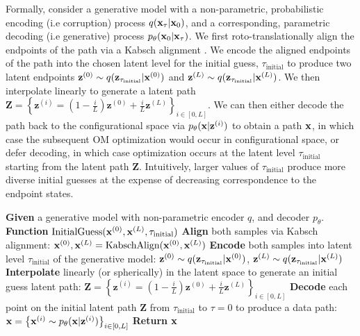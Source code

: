 Formally, consider a generative model with a non-parametric, probabilistic encoding (i.e corruption) process $q(\mathbf{x}_\tau | \mathbf{x}_0)$, and a corresponding, parametric decoding (i.e generative) process $p_\theta(\mathbf{x}_0 | \mathbf{x}_\tau)$. We first roto-translationally align the endpoints of the path via a Kabsch alignment \cite {kabsch1993automatic}. We encode the aligned endpoints of the path into the chosen latent level for the initial guess, $\tau_{\text{initial}}$ to produce two latent endpoints $\mathbf{z}^{(0)} \sim q(\mathbf{z}_{\tau_{\text{initial}}} | \mathbf{x}^{(0)})$ and $\mathbf{z}^{(L)} \sim q(\mathbf{z}_{\tau_{\text{initial}}} | \mathbf{x}^{(L)})$. We then interpolate linearly to generate a latent path $\mathbf{Z} = \left \{ \mathbf{z}^{(i)} = (1-\frac{i}{L})\mathbf{z}^{(0)} + \frac{i}{L}\mathbf{z}^{(L)} \right \}_{i \in \left[0, L \right]}$. We can then either decode the path back to the configurational space via $p_\theta(\mathbf{x} | \mathbf{z}^{(i)})$ to obtain a path $\mathbf{x}$, in which case the subsequent OM optimization would occur in configurational space, or defer decoding, in which case optimization occurs at the latent level $\tau_{\text{initial}}$ starting from the latent path $\mathbf{Z}$. Intuitively, larger values of $\tau_\text{initial}$ produce more diverse initial guesses at the expense of decreasing correspondence to the endpoint states.

\begin{algorithm}
\caption{Initial Guess Path Generation with a Generative Model}
\begin{algorithmic}[1]
\label{alg:gen_initial_guess}
\STATE \textbf{Given} a generative model with non-parametric encoder $q$, and decoder $p_\theta$.
\STATE \textbf{Function} $\text{InitialGuess}(\mathbf{x}^{(0)}, \mathbf{x}^{(L)}, \tau_{\text{initial}})$
\STATE \quad \textbf{Align} both samples via Kabsch alignment: 
\STATE \quad \quad $\mathbf{x}^{(0)}, \mathbf{x}^{(L)} = \text{KabschAlign}(\mathbf{x}^{(0)}, \mathbf{x}^{(L)})$
\STATE \quad \textbf{Encode} both samples into latent level $\tau_{\text{initial}}$ of the generative model:
\STATE \quad \quad $\mathbf{z}^{(0)} \sim q(\mathbf{z}_{\tau_{\text{initial}}} | \mathbf{x}^{(0)})$, $\mathbf{z}^{(L)} \sim q(\mathbf{z}_{\tau_{\text{initial}}} | \mathbf{x}^{(L)})$
\STATE \quad \textbf{Interpolate} linearly (or spherically) in the latent space to generate an initial guess latent path:
\STATE \quad \quad $\mathbf{Z} = \left \{ \mathbf{z}^{(i)} = (1-\frac{i}{L})\mathbf{z}^{(0)} + \frac{i}{L}\mathbf{z}^{(L)} \right \}_{i \in \left[0, L \right]}$
\STATE \quad \textbf{Decode} each point on the initial latent path $\mathbf{Z}$ from $\tau_{\text{initial}}$ to $\tau = 0$ to produce a data path:
\STATE \quad \quad $\mathbf{x} = \left\{\mathbf{x}^{(i)} \sim p_\theta(\mathbf{x} | \mathbf{z}^{(i)})\right\}_{i \in \left[0, L\right]}$
\STATE \quad \textbf{Return} $\mathbf{x}$
\end{algorithmic}
\end{algorithm}

